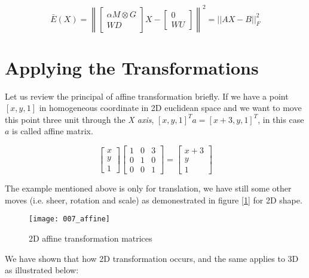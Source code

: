 \documentclass[../structure.tex]{subfiles}
\begin{document}
\begin{equation}
\bar{E}(X) = \left\|
\begin{bmatrix}
\alpha M \otimes G \\ WD
\end{bmatrix}
X -
\begin{bmatrix}
0 \\ WU
\end{bmatrix}
\right\| ^2 = ||AX - B||_{F}^2
\end{equation}

\section{Applying the Transformations}
Let us review the principal of affine transformation briefly. If we have a point $[x,y,1]$ in homogeneous coordinate in 2D euclidean space and we want to move this point three unit through the \textit{X axis}, $[x,y,1]^T a = [x+3,y,1]^T$, in this case $a$ is called affine matrix.

\begin{equation*}
\begin{bmatrix}
x \\ y \\ 1
\end{bmatrix}
\begin{bmatrix}
1 & 0 & 3 \\
0 & 1 & 0 \\
0 & 0 & 1
\end{bmatrix}
= 
\begin{bmatrix}
x + 3 \\ y \\ 1
\end{bmatrix}
\end{equation*}

The example mentioned above is only for translation, we have still some other moves (i.e. sheer, rotation and scale) as demonestrated in figure [\ref{fig:affine}] for 2D shape.

\begin{figure}[h!]
\centering
\texttt{[image: 007\_affine]}
\captionsetup{justification=centering}
\caption{2D affine transformation matrices \cite{Wikipedia2016}}
\label{fig:affine}
\end{figure}

We have shown that how 2D transformation occurs, and the same applies to 3D as illustrated below:
\end{document}
